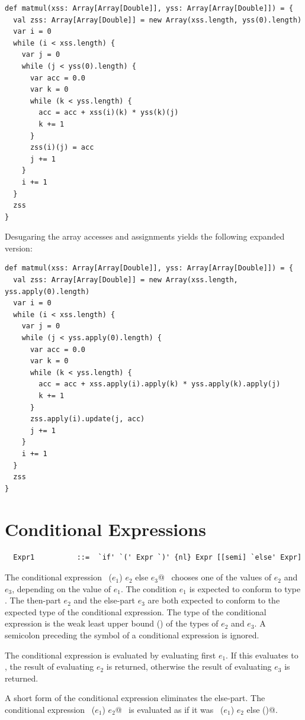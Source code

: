 \begin{lstlisting}
def matmul(xss: Array[Array[Double]], yss: Array[Array[Double]]) = {
  val zss: Array[Array[Double]] = new Array(xss.length, yss(0).length) 
  var i = 0 
  while (i < xss.length) {
    var j = 0 
    while (j < yss(0).length) {
      var acc = 0.0 
      var k = 0 
      while (k < yss.length) {
        acc = acc + xss(i)(k) * yss(k)(j) 
        k += 1
      }
      zss(i)(j) = acc 
      j += 1
    }
    i += 1
  }
  zss
}
\end{lstlisting}
Desugaring the array accesses and assignments yields the following
expanded version:
\begin{lstlisting}
def matmul(xss: Array[Array[Double]], yss: Array[Array[Double]]) = {
  val zss: Array[Array[Double]] = new Array(xss.length, yss.apply(0).length) 
  var i = 0 
  while (i < xss.length) {
    var j = 0 
    while (j < yss.apply(0).length) {
      var acc = 0.0 
      var k = 0 
      while (k < yss.length) {
        acc = acc + xss.apply(i).apply(k) * yss.apply(k).apply(j) 
        k += 1
      }
      zss.apply(i).update(j, acc) 
      j += 1
    }
    i += 1
  }
  zss
}
\end{lstlisting}

\section{Conditional Expressions}\label{sec:cond}

\syntax\begin{lstlisting}
  Expr1          ::=  `if' `(' Expr `)' {nl} Expr [[semi] `else' Expr]
\end{lstlisting}

The conditional expression ~\lstinline@if ($e_1$) $e_2$ else $e_3$@~ chooses
one of the values of $e_2$ and $e_3$, depending on the
value of $e_1$. The condition $e_1$ is expected to
conform to type .  The then-part $e_2$ and the
else-part $e_3$ are both expected to conform to the expected
type of the conditional expression. The type of the conditional
expression is the weak least upper bound ()
of the types of $e_2$ and
$e_3$.  A semicolon preceding the  symbol of a
conditional expression is ignored.

The conditional expression is evaluated by evaluating first
$e_1$. If this evaluates to , the result of
evaluating $e_2$ is returned, otherwise the result of
evaluating $e_3$ is returned.

A short form of the conditional expression eliminates the
else-part. The conditional expression ~\lstinline@if ($e_1$) $e_2$@~ is
evaluated as if it was ~\lstinline@if ($e_1$) $e_2$ else ()@.  

